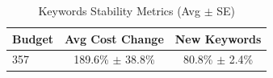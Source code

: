 \begin{table}[htbp]
\centering
\caption{Keywords Stability Metrics (Avg $\pm$ SE)}
\begin{tabular}{lcc}
\toprule
Budget & Avg Cost Change & New Keywords \\
\midrule
357 & 189.6\% $\pm$ 38.8\% & 80.8\% $\pm$ 2.4\% \\
\bottomrule
\end{tabular}
\end{table}